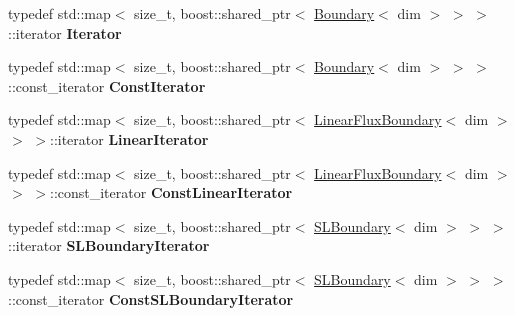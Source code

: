 \begin{DoxyCompactItemize}
\item 
\hypertarget{classnatrium_1_1BoundaryCollection_a48a9256fb603f1bc4b7e04b6feef0feb}{
typedef std::map$<$ size\_\-t, boost::shared\_\-ptr$<$ \hyperlink{classnatrium_1_1Boundary}{Boundary}$<$ dim $>$ $>$ $>$::iterator {\bfseries Iterator}}
\label{classnatrium_1_1BoundaryCollection_a48a9256fb603f1bc4b7e04b6feef0feb}

\item 
\hypertarget{classnatrium_1_1BoundaryCollection_ad617c979f5d65a32f669276fa18702da}{
typedef std::map$<$ size\_\-t, boost::shared\_\-ptr$<$ \hyperlink{classnatrium_1_1Boundary}{Boundary}$<$ dim $>$ $>$ $>$::const\_\-iterator {\bfseries ConstIterator}}
\label{classnatrium_1_1BoundaryCollection_ad617c979f5d65a32f669276fa18702da}

\item 
\hypertarget{classnatrium_1_1BoundaryCollection_a47cdf0b0d4ff41838c28b13714768af9}{
typedef std::map$<$ size\_\-t, boost::shared\_\-ptr$<$ \hyperlink{classnatrium_1_1LinearFluxBoundary}{LinearFluxBoundary}$<$ dim $>$ $>$ $>$::iterator {\bfseries LinearIterator}}
\label{classnatrium_1_1BoundaryCollection_a47cdf0b0d4ff41838c28b13714768af9}

\item 
\hypertarget{classnatrium_1_1BoundaryCollection_a886a6e984b43ab1ad7b79610b6960a6a}{
typedef std::map$<$ size\_\-t, boost::shared\_\-ptr$<$ \hyperlink{classnatrium_1_1LinearFluxBoundary}{LinearFluxBoundary}$<$ dim $>$ $>$ $>$::const\_\-iterator {\bfseries ConstLinearIterator}}
\label{classnatrium_1_1BoundaryCollection_a886a6e984b43ab1ad7b79610b6960a6a}

\item 
\hypertarget{classnatrium_1_1BoundaryCollection_af5968712678ecdd739a1bd103aca9adf}{
typedef std::map$<$ size\_\-t, boost::shared\_\-ptr$<$ \hyperlink{classnatrium_1_1SLBoundary}{SLBoundary}$<$ dim $>$ $>$ $>$::iterator {\bfseries SLBoundaryIterator}}
\label{classnatrium_1_1BoundaryCollection_af5968712678ecdd739a1bd103aca9adf}

\item 
\hypertarget{classnatrium_1_1BoundaryCollection_a59b89c5c7dfaf37311f23012720cd536}{
typedef std::map$<$ size\_\-t, boost::shared\_\-ptr$<$ \hyperlink{classnatrium_1_1SLBoundary}{SLBoundary}$<$ dim $>$ $>$ $>$::const\_\-iterator {\bfseries ConstSLBoundaryIterator}}
\label{classnatrium_1_1BoundaryCollection_a59b89c5c7dfaf37311f23012720cd536}


\end{DoxyCompactItemize}
